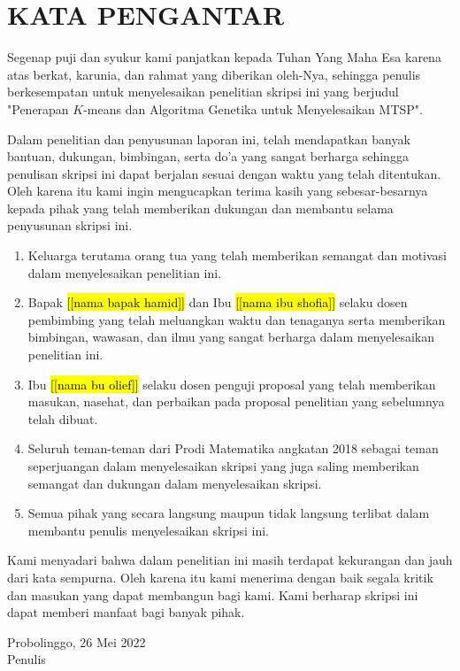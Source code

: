 \newpage
{}

\chapter*{KATA PENGANTAR}

Segenap puji dan syukur kami panjatkan kepada Tuhan Yang Maha Esa karena atas berkat, karunia, dan rahmat yang diberikan oleh-Nya, sehingga penulis berkesempatan untuk menyelesaikan penelitian skripsi ini yang berjudul "Penerapan $K$-means dan Algoritma Genetika untuk Menyelesaikan MTSP".

Dalam penelitian dan penyusunan laporan ini, telah mendapatkan banyak bantuan, dukungan, bimbingan, serta do'a yang sangat berharga sehingga penulisan skripsi ini dapat berjalan sesuai dengan waktu yang telah ditentukan.
Oleh karena itu kami ingin mengucapkan terima kasih yang sebesar-besarnya kepada pihak yang telah memberikan dukungan dan membantu selama penyusunan skripsi ini.

\begin{enumerate}
	\item Keluarga terutama orang tua yang telah memberikan semangat dan motivasi dalam menyelesaikan penelitian ini.
	\item Bapak \hl{[[nama bapak hamid]]} dan Ibu \hl{[[nama ibu shofia]]} selaku dosen pembimbing yang telah meluangkan waktu dan tenaganya serta memberikan bimbingan, wawasan, dan ilmu yang sangat berharga dalam menyelesaikan penelitian ini.
	\item Ibu \hl{[[nama bu olief]]} selaku dosen penguji proposal yang telah memberikan masukan, nasehat, dan perbaikan pada proposal penelitian yang sebelumnya telah dibuat.
	\item Seluruh teman-teman dari Prodi Matematika angkatan 2018 sebagai teman seperjuangan dalam menyelesaikan skripsi yang juga saling memberikan semangat dan dukungan dalam menyelesaikan skripsi.
	\item Semua pihak yang secara langsung maupun tidak langsung terlibat dalam membantu penulis menyelesaikan skripsi ini.
\end{enumerate}

Kami menyadari bahwa dalam penelitian ini masih terdapat kekurangan dan jauh dari kata sempurna. Oleh karena itu kami menerima dengan baik segala kritik dan masukan yang dapat membangun bagi kami. Kami berharap skripsi ini dapat memberi manfaat bagi banyak pihak.

\begin{flushright}
Probolinggo, 26 Mei 2022\\
Penulis
\end{flushright}